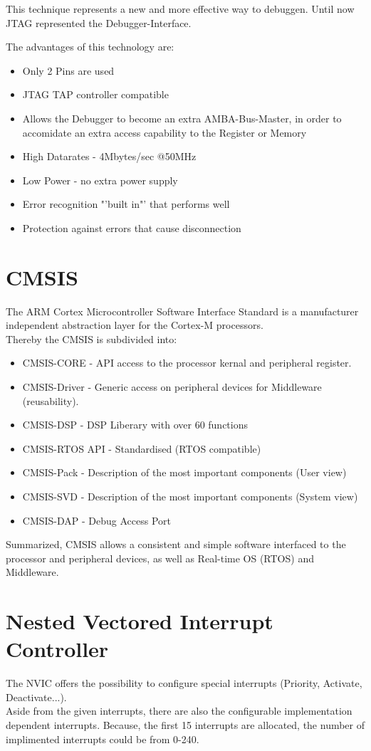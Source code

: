 This technique represents a new and more effective way to debuggen. Until now JTAG 
represented the Debugger-Interface.  


The advantages of this technology are:

\begin{itemize}
\item Only 2 Pins are used
\item JTAG TAP controller compatible
\item Allows the Debugger to become an extra AMBA-Bus-Master, in order to accomidate an extra 
access capability to the Register or Memory
\item High Datarates - 4Mbytes/sec @50MHz
\item Low Power - no extra power supply 
\item Error recognition "'built in"' that performs well
\item Protection against errors that cause disconnection
\end{itemize}  

\section{CMSIS}
The ARM Cortex Microcontroller Software Interface Standard is a manufacturer independent 
abstraction layer for the Cortex-M processors.\\
Thereby the CMSIS is subdivided into:
\begin{itemize}
\item CMSIS-CORE - API access to the processor kernal and peripheral register.
\item CMSIS-Driver - Generic access on peripheral devices for Middleware
			(reusability).
\item CMSIS-DSP - DSP Liberary with over 60 functions
\item CMSIS-RTOS API - Standardised (RTOS compatible)
\item CMSIS-Pack - Description of the most important components (User view)
\item CMSIS-SVD - Description of the most important components (System view)
\item CMSIS-DAP - Debug Access Port
\end{itemize}

Summarized, CMSIS allows a consistent and simple software interfaced to the processor 
and peripheral devices, as well as Real-time OS (RTOS) and Middleware.

\section{Nested Vectored Interrupt Controller}
The NVIC offers the possibility to configure special interrupts 
(Priority, Activate, Deactivate...). \\
Aside from the given interrupts, there are also the configurable implementation dependent interrupts.  
Because, the first 15 interrupts are allocated, the number of implimented interrupts could be from 0-240.

